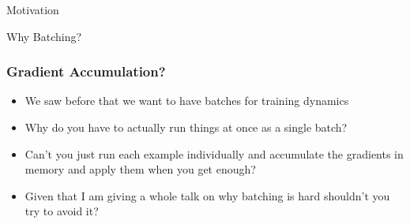 \documentclass{beamer}
\begin{document}
\begin{section}{Motivation}
\begin{subsection}{Why Batching?}
        \begin{frame}
            \frametitle{Gradient Accumulation?}
            \begin{itemize}
                \item We saw before that we want to have batches for training dynamics
                \item Why do you have to actually run things at once as a single batch?
                \item Can't you just run each example individually and accumulate the gradients in memory and apply them
                    when you get enough?
                \item Given that I am giving a whole talk on why batching is hard shouldn't you try to avoid it?
            \end{itemize}
        \end{frame}


\end{subsection}
\end{section}
\end{document}
